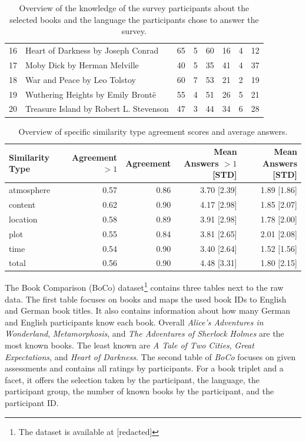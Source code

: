 \documentclass[11pt]{article}
\begin{document}
\begin{table}[ht!]
\begin{tabular}{clrrrrrr}
		16 & Heart of Darkness by Joseph Conrad &      65 &   5 &  60 &    16 &   4 &  12 \\
		17 & Moby Dick by Herman Melville &      40 &   5 &  35 &    41 &   4 &  37 \\
		18 & War and Peace by Leo Tolstoy &      60 &   7 &  53 &    21 &   2 &  19 \\
		19 & Wuthering Heights by Emily Brontë &      55 &   4 &  51 &    26 &   5 &  21 \\
		20 & Treasure Island by Robert L. Stevenson &      47 &   3 &  44 &    34 &   6 &  28 \\
		\bottomrule
	\end{tabular}
	\caption[Overview of Book Familiarity]{Overview of the knowledge of the survey participants about the selected books and the language the participants chose to answer the survey.}
	\label{tab:book_knowledge}
\end{table}
\begin{table}
	\centering
	\begin{tabular}{lrrrr}
		\toprule
		Similarity Type &  Agreement $> 1$ &	Agreement	&   Mean Answers $> 1$ [STD]	&	Mean Answers [STD]\\ 
		\midrule
		atmosphere &   0.57 &  0.86 &	3.70 [2.39] &	1.89 [1.86]\\
		content &   0.62 &  0.90  &	4.17 [2.98] &	1.85 [2.07]\\
		location &   0.58 &  0.89  &	3.91 [2.98] &	1.78 [2.00]\\
		plot &   0.55 &  0.84  &	3.81 [2.65] &	2.01 [2.08]\\
		time &   0.54 &  0.90 &	3.40 [2.64] &	1.52 [1.56]\\
		total &   0.56 &  0.90 &	4.48 [3.31] &	1.80 [2.15]\\
		\bottomrule
	\end{tabular}
	\caption[Overview of Specific Similarity Type Agreement Scores]{Overview of specific similarity type agreement scores and average answers.}
	\label{tab:similarity_agreement}
\end{table}
The Book Comparison (BoCo) dataset\footnote{The dataset is available at [redacted]} %
contains three tables next to the raw data.
The first table focuses on books and maps the used book IDs to English and German book titles.
It also contains information about how many German and English participants know each book.
Overall \textit{Alice's Adventures in Wonderland}, \textit{Metamorphosis}, and \textit{The Adventures of Sherlock Holmes} are the most known books.
The least known are \textit{A Tale of Two Cities}, \textit{Great Expectations}, and \textit{Heart of Darkness}.
The second table of \emph{BoCo} focuses on given assessments and contains all ratings by participants.
For a book triplet and a facet, it offers the selection taken by the participant, the language, the participant group, the number of known books by the participant, and the participant ID.
\end{document}
